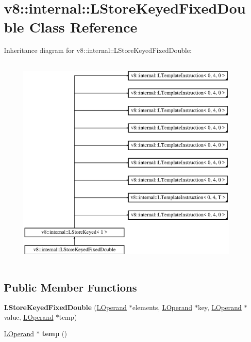 \hypertarget{classv8_1_1internal_1_1_l_store_keyed_fixed_double}{}\section{v8\+:\+:internal\+:\+:L\+Store\+Keyed\+Fixed\+Double Class Reference}
\label{classv8_1_1internal_1_1_l_store_keyed_fixed_double}
Inheritance diagram for v8\+:\+:internal\+:\+:L\+Store\+Keyed\+Fixed\+Double\+:\begin{figure}[H]
\begin{center}
\leavevmode
\includegraphics[height=11.000000cm]{classv8_1_1internal_1_1_l_store_keyed_fixed_double}
\end{center}
\end{figure}
\subsection*{Public Member Functions}
\begin{DoxyCompactItemize}
\item 
{\bfseries L\+Store\+Keyed\+Fixed\+Double} (\hyperlink{classv8_1_1internal_1_1_l_operand}{L\+Operand} $\ast$elements, \hyperlink{classv8_1_1internal_1_1_l_operand}{L\+Operand} $\ast$key, \hyperlink{classv8_1_1internal_1_1_l_operand}{L\+Operand} $\ast$value, \hyperlink{classv8_1_1internal_1_1_l_operand}{L\+Operand} $\ast$temp)\hypertarget{classv8_1_1internal_1_1_l_store_keyed_fixed_double_a603a89bc252986cc73a69076400e72f1}{}\label{classv8_1_1internal_1_1_l_store_keyed_fixed_double_a603a89bc252986cc73a69076400e72f1}

\item 
\hyperlink{classv8_1_1internal_1_1_l_operand}{L\+Operand} $\ast$ {\bfseries temp} ()\hypertarget{classv8_1_1internal_1_1_l_store_keyed_fixed_double_ac0cdd57ac5afa58a6b776ae2bf572d21}{}\label{classv8_1_1internal_1_1_l_store_keyed_fixed_double_ac0cdd57ac5afa58a6b776ae2bf572d21}

\end{DoxyCompactItemize}
